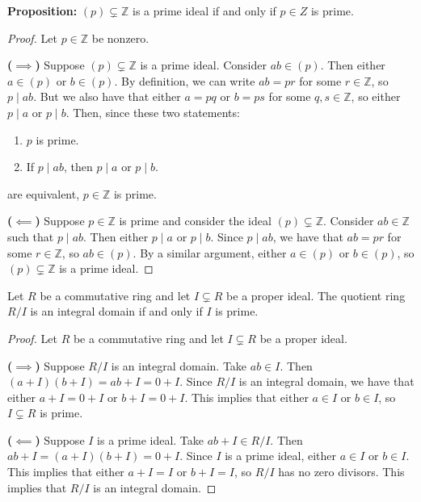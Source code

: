 \documentclass [12pt] {article}
\newcommand{\Z}{\mathbb{Z}}
\newenvironment{theorem}[1]{\begin{tcolorbox}[title={Theorem #1},colback=green!5!white,colframe=black!75!green]}{\end{tcolorbox}}
\renewcommand{\bf}[1]{\textbf{{#1}}}
\begin{document}
\bf{Proposition:} $(p) \subsetneq \Z$ is a prime ideal if and only if $p \in Z$ is prime.
\begin{proof}
    Let $p \in \Z$ be nonzero.
    \vspace{0.5em}

    \bf{($\bm{\implies}$)}
    Suppose $(p) \subsetneq \Z$ is a prime ideal. Consider $ab \in (p)$. Then either $a \in (p)$ or
    $b \in (p)$. By definition, we can write $ab = pr$ for some $r \in \Z$, so $p \mid ab$. But we
    also have that either $a = pq$ or $b = ps$ for some $q, s \in \Z$, so either $p \mid a$ or
    $p \mid b$. Then, since these two statements:
    \begin{enumerate}[label=(\arabic*)]
        \item $p$ is prime.
        \item If $p \mid ab$, then $p \mid a$ or $p \mid b$.
    \end{enumerate}
    are equivalent, $p \in \Z$ is prime.
    \vspace{0.5em}

    \bf{($\bm{\impliedby}$)}
    Suppose $p \in \Z$ is prime and consider the ideal $(p) \subsetneq \Z$. Consider $ab \in \Z$
    such that $p \mid ab$. Then either $p \mid a$ or $p \mid b$. Since $p \mid ab$, we have that
    $ab = pr$ for some $r \in \Z$, so $ab \in (p)$. By a similar argument, either $a \in (p)$ or
    $b \in (p)$, so $(p) \subsetneq \Z$ is a prime ideal.
\end{proof}

\begin{theorem}{}
    Let $R$ be a commutative ring and let $I \subsetneq R$ be a proper ideal. The quotient ring
    $R/I$ is an integral domain if and only if $I$ is prime.
\end{theorem}
\begin{proof}
    Let $R$ be a commutative ring and let $I \subsetneq R$ be a proper ideal.
    \vspace{0.5em}

    \bf{($\bm{\implies}$)}
    Suppose $R/I$ is an integral domain. Take $ab \in I$. Then $(a + I)(b + I) = ab + I = 0 + I$.
    Since $R/I$ is an integral domain, we have that either $a + I = 0 + I$ or $b + I = 0 + I$. This
    implies that either $a \in I$ or $b \in I$, so $I \subsetneq R$ is prime.
    \vspace{0.5em}

    \bf{($\bm{\impliedby}$)}
    Suppose $I$ is a prime ideal. Take $ab + I \in R/I$. Then $ab + I = (a + I)(b + I) = 0 + I$.
    Since $I$ is a prime ideal, either $a \in I$ or $b \in I$. This implies that either $a + I = I$ or
    $b + I = I$, so $R/I$ has no zero divisors. This implies that $R/I$ is an integral domain.
\end{proof}
\end{document}
